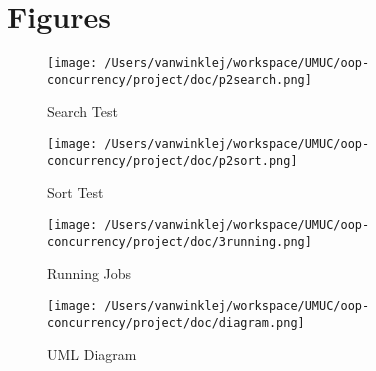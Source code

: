 \documentclass[english,floatsintext,man]{apa6}
\begin{document}
\section{Figures}\label{figures}

\begin{figure}[htbp]
\centering
\texttt{[image: /Users/vanwinklej/workspace/UMUC/oop-concurrency/project/doc/p2search.png]}
\caption{Search Test}
\end{figure}

\begin{figure}[htbp]
\centering
\texttt{[image: /Users/vanwinklej/workspace/UMUC/oop-concurrency/project/doc/p2sort.png]}
\caption{Sort Test}
\end{figure}

\begin{figure}[htbp]
\centering
\texttt{[image: /Users/vanwinklej/workspace/UMUC/oop-concurrency/project/doc/3running.png]}
\caption{Running Jobs}
\end{figure}

\begin{figure}[htbp]
\centering
\texttt{[image: /Users/vanwinklej/workspace/UMUC/oop-concurrency/project/doc/diagram.png]}
\caption{UML Diagram}
\end{figure}

\setlength{\parindent}{-0.5in} \setlength{\leftskip}{0.5in}
\end{document}
